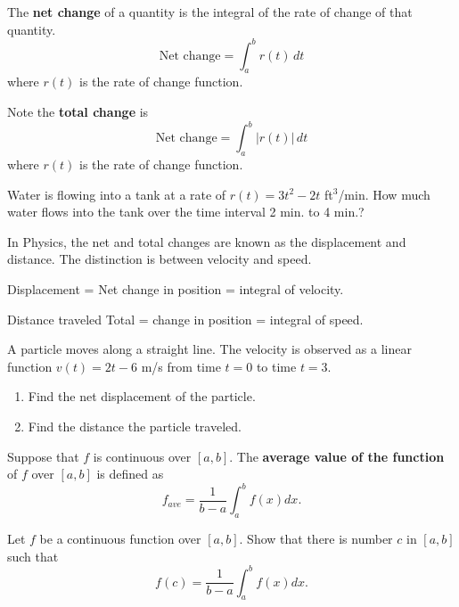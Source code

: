 \begin{definition}

The \textbf{net change} of a quantity is the integral of the rate of
change of that quantity. \[\text{Net change}=\int_a^b r(t)\,dt\] where
\(r(t)\) is the rate of change function.

Note the \textbf{total change} is
\[\text{Net change}=\int_a^b |r(t)|\,dt\] where \(r(t)\) is the rate of
change function.

\end{definition}

\begin{example}

Water is flowing into a tank at a rate of \(r(t)=3t^2-2t\) ft\(^3\)/min.
How much water flows into the tank over the time interval 2 min. to 4
min.?

In Physics, the net and total changes are known as the displacement and
distance. The distinction is between velocity and speed.

Displacement = Net change in position = integral of velocity.

Distance traveled Total = change in position = integral of speed.

\end{example}
\vspace*{6\baselineskip}

\begin{example}

A particle moves along a straight line. The velocity is observed as a
linear function \(v(t)=2t-6\) m/s from time \(t=0\) to time \(t=3\).

\begin{enumerate}
\item
  Find the net displacement of the particle.
\item
  Find the distance the particle traveled.
\end{enumerate}

\end{example}

\begin{definition}

Suppose that \(f\) is continuous over \([a,b]\). The \textbf{average
value of the function} of \(f\) over \([a, b]\) is defined as
\[f_{ave}=\dfrac{1}{b-a}\int_a^bf(x)dx.\]

\end{definition}

\begin{example}

Let \(f\) be a continuous function over \([a, b]\). Show that there is
number \(c\) in \([a,b]\) such that
\[f(c)=\dfrac{1}{b-a}\int_a^bf(x)dx.\]

\end{example}
\vspace*{6\baselineskip}

